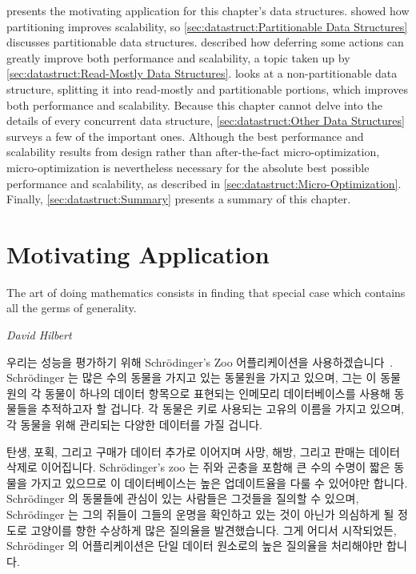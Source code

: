 presents the motivating application for this chapter's data structures.
 showed how
partitioning improves scalability, so
\cref{sec:datastruct:Partitionable Data Structures}
discusses partitionable data structures.
 described how deferring some
actions can greatly improve both performance and scalability,
a topic taken up by
\cref{sec:datastruct:Read-Mostly Data Structures}.
looks at a non-partitionable data structure, splitting
it into read-mostly and partitionable portions,
which improves both performance and scalability.
Because this chapter cannot delve into the details of every concurrent
data structure,
\cref{sec:datastruct:Other Data Structures}
surveys a few of the important ones.
Although the best performance and scalability results from design rather
than after-the-fact micro-optimization, micro-optimization is nevertheless
necessary for the absolute best possible performance and scalability,
as described in
\cref{sec:datastruct:Micro-Optimization}.
Finally, \cref{sec:datastruct:Summary}
presents a summary of this chapter.

\fi

\section{Motivating Application}
\label{sec:datastruct:Motivating Application}
%
\epigraph{The art of doing mathematics consists in finding that special
	  case which contains all the germs of generality.}
	 {\emph{David Hilbert}}

우리는 성능을 평가하기 위해 Schr\"odinger's Zoo 어플리케이션을
사용하겠습니다~\cite{McKenney:2013:SDS:2483852.2483867}.
Schr\"odinger 는 많은 수의 동물을 가지고 있는 동물원을 가지고 있으며, 그는 이
동물원의 각 동물이 하나의 데이터 항목으로 표현되는 인메모리 데이터베이스를
사용해 동물들을 추적하고자 할 겁니다.
각 동물은 키로 사용되는 고유의 이름을 가지고 있으며, 각 동물을 위해 관리되는
다양한 데이터를 가질 겁니다.

탄생, 포획, 그리고 구매가 데이터 추가로 이어지며 사망, 해방, 그리고 판매는
데이터 삭제로 이어집니다.
Schr\"odinger's zoo 는 쥐와 곤충을 포함해 큰 수의 수명이 짧은 동물을 가지고
있으므로 이 데이터베이스는 높은 업데이트율을 다룰 수 있어야만 합니다.
Schr\"odinger 의 동물들에 관심이 있는 사람들은 그것들을 질의할 수 있으며,
Schr\"odinger 는 그의 쥐들이 그들의 운명을 확인하고 있는 것이 아닌가 의심하게
될 정도로 고양이를 향한 수상하게 많은 질의율을 발견했습니다.
그게 어디서 시작되었든, Schr\"odinger 의 어플리케이션은 단일 데이터 원소로의
높은 질의율을 처리해야만 합니다.

